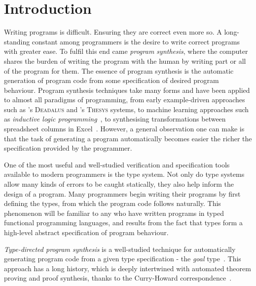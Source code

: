 \chapter{Introduction}
\label{chapter:intro}
Writing programs is difficult. Ensuring they are correct even more so. A
long-standing constant among programmers is the desire to write correct programs
with greater ease. To fulfil this end came \emph{program synthesis}, where the
computer shares the burden of writing the program with the human by writing part
or all of the program for them. The essence of program synthesis is the
automatic generation of program code from some specification of desired program
behaviour. Program synthesis techniques take many forms and have been applied to
almost all paradigms of programming, from early example-driven approaches such
as \citet{deadalus}'s \textsc{Deadalus} and \citet{10.1145/321992.322002}'s \textsc{Thesys} systems, to
machine learning approaches such as \textit{inductive logic
programming}~\citep{MUGGLETON1994629}, to synthesising transformations between
spreadsheet columns in Excel~\citep{flashfill}. However, a general observation
one can make is that the task of generating a program automatically becomes
easier the richer the specification provided by the programmer. 

One of the most useful and well-studied verification and specification tools
available to modern programmers is the type system. Not only do type systems
allow many kinds of errors to be caught statically, they also help inform the
design of a program. Many programmers begin writing their programs by first
defining the types, from which the program code follows naturally. This
phenomenon will be familiar to any who have written programs in typed functional
programming languages, and results from the fact that types form a high-level
abstract specification of program behaviour. 

\emph{Type-directed program synthesis} is a well-studied technique for
automatically generating program code from a given type specification - the
\textit{goal} type~\citep{oseraMYTH1,10.1145/1809028.1806632, synthesis2,
DBLP:conf/cav/AlbarghouthiGK13, 10.1145/2737924.2737977,
osera2019constraintbased}. This approach has a long history, which is deeply
intertwined with automated theorem proving and proof synthesis, thanks to the
Curry-Howard correspondence~\citep{manna1980deductive,10.5555/1624562.1624585}. 

